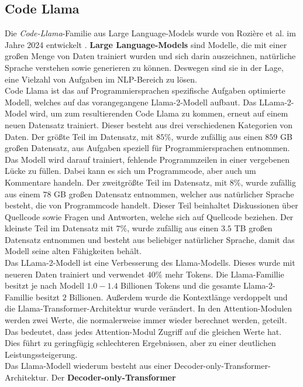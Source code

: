 \documentclass[12pt,letterpaper,ngerman]{article}
\begin{document}
\subsection{Code Llama}
Die \textit{Code-Llama}-Familie aus Large Language-Models wurde von 
Rozière et al. im Jahre 2024 entwickelt
\cite{rozière2024codellamaopenfoundation}.
{\bf Large Language-Models} sind Modelle, die mit
einer großen Menge von Daten trainiert wurden und sich darin
auszeichnen, natürliche Sprache verstehen sowie generieren zu
können. Deswegen sind sie in der Lage, eine Vielzahl von Aufgaben
im NLP-Bereich zu lösen.\\
Code Llama ist das auf Programmiersprachen 
spezifische Aufgaben optimierte Modell, welches 
auf das vorangegangene Llama-2-Modell aufbaut.
Das LLama-2-Model wird,
um zum resultierenden Code Llama zu kommen, erneut auf einem neuen
Datensatz trainiert. Dieser besteht aus drei verschiedenen 
Kategorien von Daten. Der größte Teil im Datensatz,
mit $85 \%$, wurde zufällig aus einen $859$ GB großen Datensatz,
aus Aufgaben speziell für Programmiersprachen entnommen.
Das Modell wird darauf trainiert, fehlende Programmzeilen in 
einer vergebenen Lücke zu füllen. Dabei kann es sich um Programmcode,
aber auch um Kommentare handeln. Der zweitgrößte Teil im Datensatz,
mit $8 \%$, wurde zufällig aus einem $78$ GB großen Datensatz entnommen,
welcher aus natürlicher Sprache besteht, die von
Programmcode handelt. Dieser Teil beinhaltet Diskussionen über 
Quellcode
sowie Fragen und Antworten, welche sich auf Quellcode beziehen. 
Der kleinste Teil im Datensatz mit $7 \%$, wurde zufällig aus einen 
$3.5$ TB großen Datensatz entnommen und
besteht aus beliebiger natürlicher Sprache, damit das Modell
seine alten Fähigkeiten behält.\\
Das LLama-2-Modell ist eine Verbesserung des Llama-Modells.
Dieses wurde mit neueren Daten trainiert und verwendet 
$40 \%$ mehr Tokens. Die Llama-Famillie besitzt je nach Modell
$1.0-1.4$ Billionen Tokens und die gesamte Llama-2-Famillie 
besitzt $2$ Billionen.
Außerdem wurde die Kontextlänge verdoppelt und
die Llama-Transformer-Architektur wurde verändert. 
In den Attention-Modulen werden zwei Werte, die normalerweise 
immer wieder berechnet werden, geteilt. Das bedeutet, dass 
jedes Attention-Modul Zugriff auf die gleichen Werte hat.
Dies führt zu geringfügig schlechteren Ergebnissen, aber zu
einer deutlichen Leistungssteigerung.\\
Das Llama-Modell wiederum besteht aus einer Decoder-only-Transformer-Architektur.
Der {\bf Decoder-only-Transformer}
\end{document}
